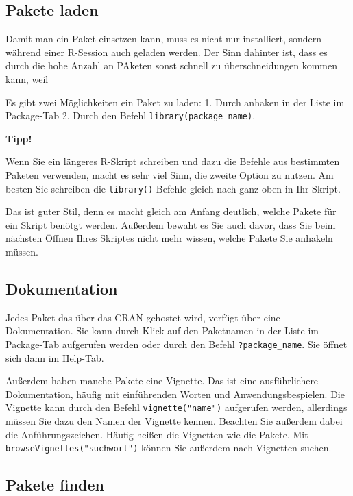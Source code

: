 \documentclass[
]{book}
\begin{document}
\hypertarget{pakete-laden}{%
\subsection{Pakete laden}\label{pakete-laden}}

Damit man ein Paket einsetzen kann, muss es nicht nur installiert, sondern während einer R-Session auch geladen werden. Der Sinn dahinter ist, dass es durch die hohe Anzahl an PAketen sonst schnell zu überschneidungen kommen kann, weil

Es gibt zwei Möglichkeiten ein Paket zu laden:
1. Durch anhaken in der Liste im Package-Tab
2. Durch den Befehl \texttt{library(package\_name)}.

\textbf{Tipp!}

Wenn Sie ein längeres R-Skript schreiben und dazu die Befehle aus bestimmten Paketen verwenden, macht es sehr viel Sinn, die zweite Option zu nutzen. Am besten Sie schreiben die \texttt{library()}-Befehle gleich nach ganz oben in Ihr Skript.

Das ist guter Stil, denn es macht gleich am Anfang deutlich, welche Pakete für ein Skript benötgt werden. Außerdem bewaht es Sie auch davor, dass Sie beim nächsten Öffnen Ihres Skriptes nicht mehr wissen, welche Pakete Sie anhakeln müssen.

\hypertarget{dokumentation}{%
\subsection{Dokumentation}\label{dokumentation}}

Jedes Paket das über das CRAN gehostet wird, verfügt über eine Dokumentation. Sie kann durch Klick auf den Paketnamen in der Liste im Package-Tab aufgerufen werden oder durch den Befehl \texttt{?package\_name}. Sie öffnet sich dann im Help-Tab.

Außerdem haben manche Pakete eine Vignette. Das ist eine ausführlichere Dokumentation, häufig mit einführenden Worten und Anwendungsbespielen. Die Vignette kann durch den Befehl \texttt{vignette("name")} aufgerufen werden, allerdings müssen Sie dazu den Namen der Vignette kennen. Beachten Sie außerdem dabei die Anführungszeichen. Häufig heißen die Vignetten wie die Pakete. Mit \texttt{browseVignettes("suchwort")} können Sie außerdem nach Vignetten suchen.

\hypertarget{pakete-finden}{%
\subsection{Pakete finden}\label{pakete-finden}}
\end{document}
